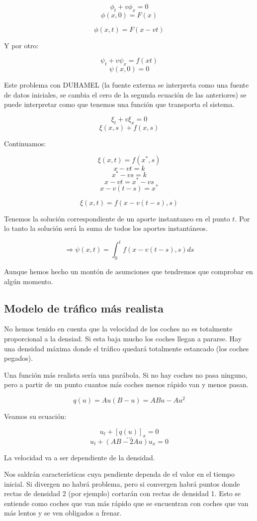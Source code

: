 			$$\phi_t + v\phi_x = 0$$
			$$\phi(x,0) = F(x) $$

			$$\phi(x,t) = F(x-vt)$$

			Y por otro:

			$$\psi_t + v\psi_x = f(xt)$$
			$$\psi(x,0) = 0$$

			Este problema con DUHAMEL (la fuente externa se interpreta como una fuente de datos iniciales, se cambia el cero de la segunda ecuación de las anteriores) se puede interpretar como que tenemos una función que transporta el sistema.

			$$\xi_t + v\xi_x = 0$$
			$$\xi(x,s) + f(x,s)$$

			Continuamos:

			$$\xi(x,t) = f(x^*,s)$$
			$$x-vt = k$$
			$$x^* - vs = k$$
			$$x-vt = x^* - vs$$
			$$x-v(t-s) = x^{*}$$

			$$\xi(x,t) = f(x - v(t-s), s)$$


			Tenemos la solución correspondiente de un aporte instantaneo en el punto $t$. Por lo tanto la solución será la suma de todos los aportes instantáneos. 

			$$\Rightarrow \psi(x,t) = \int^{t}_{0} f(x-v(t-s),s) ds $$

			Aunque hemos hecho un montón de asumciones que tendremos que comprobar en algún momento.

	\subsection{Modelo de tráfico más realista}

		No hemos tenido en cuenta que la velocidad de los coches no es totalmente proporcional a la densiad. Si esta baja mucho los coches llegan a pararse. Hay una densidad máxima donde el tráfico quedará totalmente estancado (los coches pegados).

		Una función más realista sería una parábola. Si no hay coches no pasa ninguno, pero a partir de un punto cuantos más coches menos rápido van y menos pasan.

		$$ q(u) = Au (B-u) = ABu - Au^{2} $$

		Veamos su ecuación:

		$$u_t + [q(u)]_x = 0$$
		$$ … $$
		$$ u_t + (AB - 2Au) u_x = 0 $$

		La velocidad va a ser dependiente de la densidad.

		Nos saldrán características cuya pendiente dependa de el valor en el tiempo inicial. Si divergen no habrá problema, pero si convergen habrá puntos donde rectas de densidad 2 (por ejemplo) cortarán con rectas de densidad 1. Esto se entiende como coches que van más rápido que se encuentran con coches que van más lentos y se ven obligados a frenar.



